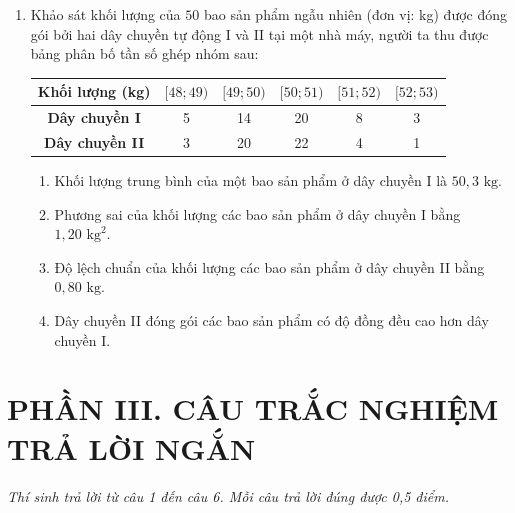 \documentclass[12pt,a4paper]{article}
\begin{document}
\begin{enumerate}[label=\textbf{Câu \arabic*:}, leftmargin=*]
\begin{minipage}[t]{0.42\linewidth}
{%
}
\end{minipage}

\item Khảo sát khối lượng của $50$ bao sản phẩm ngẫu nhiên (đơn vị: kg) được đóng gói bởi hai dây chuyền tự động I và II tại một nhà máy, người ta thu được bảng phân bố tần số ghép nhóm sau:
\begin{center}
\begin{tabular}{|c|c|c|c|c|c|}
\hline
\textbf{Khối lượng (kg)} & $[48; 49)$ & $[49; 50)$ & $[50; 51)$ & $[51; 52)$ & $[52; 53)$ \\ \hline
\textbf{Dây chuyền I} & 5 & 14 & 20 & 8 & 3 \\ \hline
\textbf{Dây chuyền II} & 3 & 20 & 22 & 4 & 1 \\ \hline
\end{tabular}
\end{center}
\begin{enumerate}[label=\textbf{\alph*)}]
    \item Khối lượng trung bình của một bao sản phẩm ở dây chuyền I là $50{,}3\text{ kg}$.
    \item Phương sai của khối lượng các bao sản phẩm ở dây chuyền I bằng $1{,}20\text{ kg}^2$.
    \item Độ lệch chuẩn của khối lượng các bao sản phẩm ở dây chuyền II bằng $0{,}80\text{ kg}$.
    \item Dây chuyền II đóng gói các bao sản phẩm có độ đồng đều cao hơn dây chuyền I.
\end{enumerate}

\end{enumerate}

\vspace{0.4cm}
\section*{\large PHẦN III. CÂU TRẮC NGHIỆM TRẢ LỜI NGẮN}
\textit{Thí sinh trả lời từ câu 1 đến câu 6. Mỗi câu trả lời đúng được 0,5 điểm.}
\end{document}
